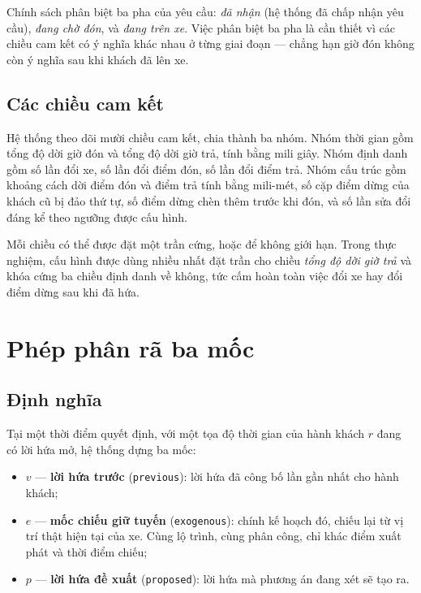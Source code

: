 Chính sách phân biệt ba pha của yêu cầu: \emph{đã nhận} (hệ thống đã chấp nhận yêu cầu),
\emph{đang chờ đón}, và \emph{đang trên xe}. Việc phân biệt ba pha
là cần thiết vì các chiều cam kết có ý nghĩa khác nhau ở từng giai đoạn --- chẳng hạn giờ đón
không còn ý nghĩa sau khi khách đã lên xe.

\subsection{Các chiều cam kết}

Hệ thống theo dõi mười chiều cam kết, chia thành ba nhóm. Nhóm thời gian gồm tổng độ dời giờ
đón và tổng độ dời giờ trả, tính bằng mili giây. Nhóm định danh gồm số lần đổi xe, số lần đổi
điểm đón, số lần đổi điểm trả. Nhóm cấu trúc gồm khoảng cách dời điểm đón và điểm trả tính bằng
mili-mét, số cặp điểm dừng của khách cũ bị đảo thứ tự, số điểm dừng chèn thêm trước khi đón, và số lần sửa
đổi đáng kể theo ngưỡng được cấu hình.

Mỗi chiều có thể được đặt một trần cứng, hoặc để không giới hạn. Trong thực nghiệm, cấu hình
được dùng nhiều nhất đặt trần cho chiều \emph{tổng độ dời giờ trả} và khóa cứng ba chiều định
danh về không, tức cấm hoàn toàn việc đổi xe hay đổi điểm dừng sau khi đã hứa.

\section{Phép phân rã ba mốc}
\label{muc:bamoc}

\subsection{Định nghĩa}
\label{muc:dinhnghia-bamoc}

Tại một thời điểm quyết định, với một tọa độ thời gian của hành khách $r$ đang có lời hứa mở,
hệ thống dựng ba mốc:

\begin{itemize}[leftmargin=1.2cm,itemsep=2pt,topsep=3pt]
\item $v$ --- \textbf{lời hứa trước} (\texttt{previous}): lời hứa đã công bố lần gần nhất cho hành khách;
\item $e$ --- \textbf{mốc chiếu giữ tuyến} (\texttt{exogenous}): chính kế hoạch đó, chiếu lại từ vị trí thật hiện tại của xe.
Cùng lộ trình, cùng phân công, chỉ khác điểm xuất phát và thời điểm chiếu;
\item $p$ --- \textbf{lời hứa đề xuất} (\texttt{proposed}): lời hứa mà phương án đang xét sẽ tạo ra.
\end{itemize}

